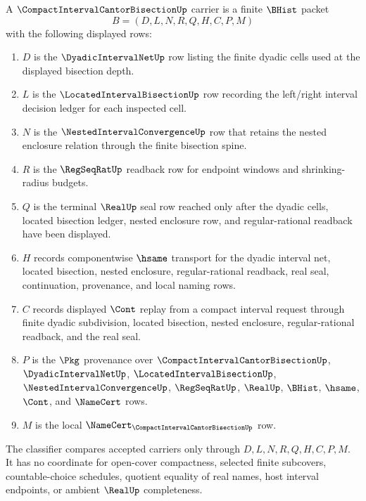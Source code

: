 \begin{definition}
\label{def:compact-interval-cantor-bisection-carrier}
A $\CompactIntervalCantorBisectionUp$ carrier is a finite $\BHist$ packet
$$
B=(D,L,N,R,Q,H,C,P,M)
$$
with the following displayed rows:
\begin{enumerate}
\item $D$ is the $\DyadicIntervalNetUp$ row listing the finite dyadic cells used at the displayed bisection depth.
\item $L$ is the $\LocatedIntervalBisectionUp$ row recording the left/right interval decision ledger for each inspected cell.
\item $N$ is the $\NestedIntervalConvergenceUp$ row that retains the nested enclosure relation through the finite bisection spine.
\item $R$ is the $\RegSeqRatUp$ readback row for endpoint windows and shrinking-radius budgets.
\item $Q$ is the terminal $\RealUp$ seal row reached only after the dyadic cells, located bisection ledger, nested enclosure row, and regular-rational readback have been displayed.
\item $H$ records componentwise $\hsame$ transport for the dyadic interval net, located bisection, nested enclosure, regular-rational readback, real seal, continuation, provenance, and local naming rows.
\item $C$ records displayed $\Cont$ replay from a compact interval request through finite dyadic subdivision, located bisection, nested enclosure, regular-rational readback, and the real seal.
\item $P$ is the $\Pkg$ provenance over $\CompactIntervalCantorBisectionUp$, $\DyadicIntervalNetUp$, $\LocatedIntervalBisectionUp$, $\NestedIntervalConvergenceUp$, $\RegSeqRatUp$, $\RealUp$, $\BHist$, $\hsame$, $\Cont$, and $\NameCert$ rows.
\item $M$ is the local $\NameCert_{\CompactIntervalCantorBisectionUp}$ row.
\end{enumerate}
The classifier compares accepted carriers only through $D,L,N,R,Q,H,C,P,M$. It has no coordinate for open-cover compactness, selected finite subcovers, countable-choice schedules, quotient equality of real names, host interval endpoints, or ambient $\RealUp$ completeness.
\end{definition}

